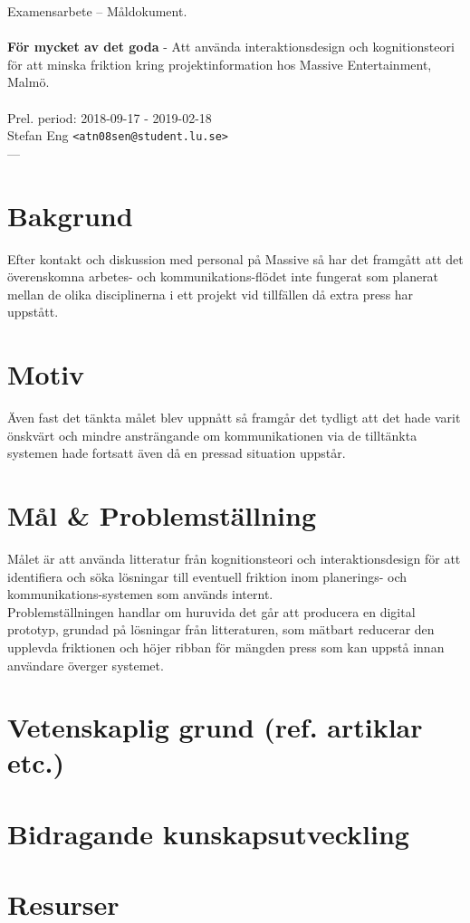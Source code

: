 \documentclass{article}
\begin{document}
\begin{center}

  Examensarbete -- Måldokument. \\
  \ \\
  {\large
    \textbf{För mycket av det goda} -
    Att använda interaktionsdesign och kognitionsteori för
    att minska friktion kring projektinformation hos Massive
    Entertainment, Malmö. \\
  }
  \ \\
  Prel. period: 2018-09-17 - 2019-02-18\\
  Stefan Eng \texttt{<atn08sen@student.lu.se>}
  \ \\
  ---
  \vspace{-0.3cm}

\end{center}

\section*{Bakgrund}

  Efter kontakt och diskussion med personal på Massive så har det framgått att
  det överenskomna arbetes- och kommunikations-flödet inte fungerat som
  planerat mellan de olika disciplinerna i ett projekt vid tillfällen då extra
  press har uppstått.

\section*{Motiv}

  Även fast det tänkta målet blev uppnått så framgår det tydligt att det hade
  varit önskvärt och mindre ansträngande om kommunikationen via de
  tilltänkta systemen hade fortsatt även då en pressad situation uppstår.

\section*{Mål \& Problemställning}

  Målet är att använda litteratur från kognitionsteori och interaktionsdesign
  för att identifiera och söka lösningar till eventuell friktion inom
  planerings- och kommunikations-systemen som används internt. \\

  Problemställningen handlar om huruvida det går att producera en
  digital prototyp, grundad på lösningar från litteraturen, som mätbart
  reducerar den upplevda friktionen och höjer ribban för mängden press som kan
  uppstå innan användare överger systemet.

\section*{Vetenskaplig grund (ref. artiklar etc.)}

\section*{Bidragande kunskapsutveckling}

\section*{Resurser}
\end{document}
